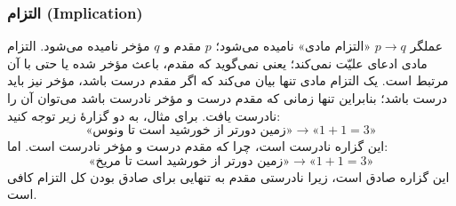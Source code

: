       \subsubsection*{التزام (Implication)}
        عملگر $p \rightarrow q$ «التزام مادی» نامیده می‌شود؛ $p$ مقدم و $q$ مؤخر نامیده می‌شود. التزام مادی ادعای علیّت نمی‌کند؛ یعنی نمی‌گوید که مقدم، باعث مؤخر شده یا حتی با آن مرتبط است. یک التزام مادی تنها بیان می‌کند که اگر مقدم درست باشد، مؤخر نیز باید درست باشد؛ بنابراین تنها زمانی که مقدم درست و مؤخر نادرست باشد می‌توان آن را نادرست یافت.
        برای مثال، به دو گزارهٔ زیر توجه کنید:
        \[
        \text{«زمین دورتر از خورشید است تا ونوس»} \rightarrow \text{«$1+1=3$»}
        \]
        این گزاره نادرست است، چرا که مقدم درست و مؤخر نادرست است. اما:
        \[
        \text{«زمین دورتر از خورشید است تا مریخ»} \rightarrow \text{«$1+1=3$»}
        \]
        این گزاره صادق است، زیرا نادرستی مقدم به تنهایی برای صادق بودن کل التزام کافی است.